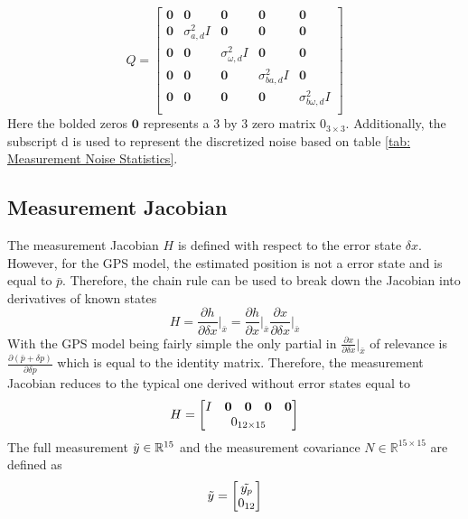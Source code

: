 \begin{equation}
    Q = \begin{bmatrix}
        \mathbf{0} & \mathbf{0} & \mathbf{0} & \mathbf{0} & \mathbf{0} \\
        \mathbf{0} & \sigma_{a,d}^2 I& \mathbf{0} & \mathbf{0} & \mathbf{0} \\
        \mathbf{0} & \mathbf{0} & \sigma_{\omega,d}^2 I & \mathbf{0} & \mathbf{0} \\
        \mathbf{0} & \mathbf{0} & \mathbf{0} & \sigma_{ba,d}^2 I  & \mathbf{0} \\
        \mathbf{0} & \mathbf{0} & \mathbf{0} & \mathbf{0} & \sigma_{b \omega,d}^2 I  \\
    \end{bmatrix}
    \label{eq: quaternion Q}
\end{equation}
Here the bolded zeros $\mathbf{0}$ represents a 3 by 3 zero matrix $0_{3 \times 3}$. Additionally, the subscript d is used to represent the discretized noise based on table \eqref{tab: Measurement Noise Statistics}.

\subsection{Measurement Jacobian}

The measurement Jacobian $H$ is defined with respect to the error state $\delta x$. However, for the GPS model, the estimated position is not a error state and is equal to $\bar{p}$. Therefore, the chain rule can be used to break down the Jacobian into 
derivatives of known states \cite{Quaternion_Kinematics_for_the_Error-state_EKF}
\begin{equation}
    H = \frac{\partial h}{\partial \delta x} \bigg|_{\bar{x}} = \frac{\partial h}{\partial x} \bigg|_{\bar{x}} \frac{\partial x}{\partial \delta x} \bigg|_{\bar{x}} 
    \label{eq: H quaternion}
\end{equation}
With the GPS model being fairly simple the only partial in $ \frac{\partial x}{\partial \delta x} |_{\bar{x}}$ of relevance is $\frac{\partial (\bar{p} + \delta p)}{\partial \delta p}$ which is equal to the identity matrix. Therefore, the measurement Jacobian reduces to the typical one derived without error states equal to 
\begin{equation}
    H = \begin{bmatrix}
        I & \mathbf{0} & \mathbf{0} & \mathbf{0} & \mathbf{0} \\
        \multicolumn{5}{c}{0_{12 \times 15}}
        \end{bmatrix}
    \label{eq: H quaternion full}
\end{equation}
The full measurement $\Tilde{y} \in \mathbb{R}^{15}$ and the measurement covariance $N \in \mathbb{R}^{15 \times 15}$ are defined as
\begin{equation}
    \Tilde{y} = \begin{bmatrix}
        \Tilde{y_p} \\
        0_{12}
    \end{bmatrix}
    \label{eq: y tilde quaternion}
\end{equation}

